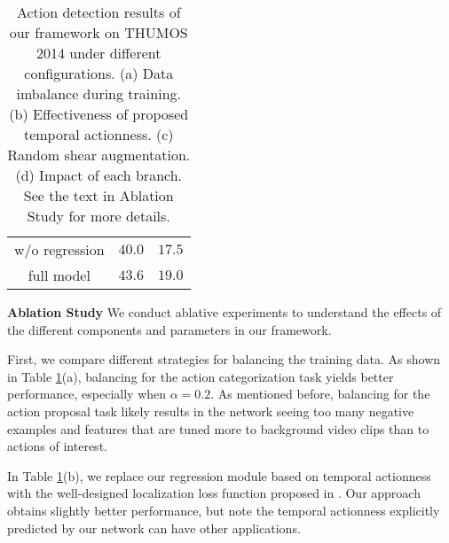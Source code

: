 \documentclass[10pt,twocolumn,letterpaper]{article}
\begin{document}
\begin{table}[t]
\begin{minipage}{0.24\textwidth}
{{\begin{tabular}{ | c | c | c |}
					w/o regression 			  & $40.0$	 &  $17.5$		\\	
					full model						  	& $43.6$	&  $19.0$		\\	
					\hline
				\end{tabular}
			}
		}
	\end{minipage}%
	\caption{Action detection results of our framework on THUMOS 2014 under different configurations. (a) Data imbalance during training. (b) Effectiveness of proposed temporal actionness. (c) Random shear augmentation. (d) Impact of each branch. See the text in Ablation Study for more details. \label{tab:Ablation}}%
	\vspace{-2ex}
\end{table} 

\noindent \textbf{Ablation Study} 
We conduct ablative experiments to understand the effects of the different components and parameters in our framework.

First, we compare different strategies for balancing the training data. As shown in Table \ref{tab:Ablation}(a), balancing for the action categorization task yields better performance, especially when $\alpha=0.2$. As mentioned before, balancing for the action proposal task likely results in the network seeing too many negative examples and features that are tuned more to background video clips than to actions of interest. 

In Table \ref{tab:Ablation}(b), we replace our regression module based on temporal actionness with the well-designed localization loss function proposed in \cite{scnn_shou_wang_chang_cvpr16}. Our approach obtains slightly better performance, but note the temporal actionness explicitly predicted by our network can have other applications.
\end{document}
